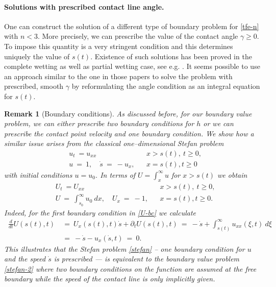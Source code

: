\documentclass[pagesize,pdftex]{amsart}
\newtheorem{remark}[theorem]{Remark}
\newcommand{\p}{\partial}
\newcommand{\gam}{\gamma}
\newcommand{\ddt}{\, \frac{d}{dt}}
\begin{document}
\paragraph{Solutions with prescribed contact line angle.} One can construct the
solution of a different type of boundary problem for \eqref{tfe-n} with
$n<3$. More precisely, we can prescribe the value of the contact angle
$\gam \geq 0$. To impose this quantity is a very stringent condition and this
determines uniquely the value of $s(t)$. Existence of such solutions has been
proved in the complete wetting as well as partial wetting case, see
e.g. \cite{BertozziPugh-1994,BerettaBertschDalpasso-1995,BertschDalpassoGarckeGruen-1998,DalpassoGarckeGruen-1998,Gruen-2004-1,GiacomelliKnuepferOtto-2008,GnannWisse-2022}. It
seems possible to use an approach similar to the one in those papers to solve
the problem with prescribed, smooth $\gam$ by reformulating the angle condition
as an integral equation for $s(t)$.
\begin{remark}[Boundary conditions] %
  As discussed before, for our boundary value problem, we can either prescribe
  two boundary conditions for $h$ or we can prescribe the contact point velocity
  and one boundary condition. We show how a similar issue arises from the
  classical one--dimensional Stefan problem
    \begin{align} \label{stefan}
      &u_t  \ = u_{xx}\ \ 
      &&x>s(t),  \ t \geq 0, \\
      &u  \ = \  1, \quad  \dot s \ = \ - u_x, 
      &&x = s(t),  t \geq 0
    \end{align}
    with initial conditions $u = u_0$. In terms of $U = \int_x^\infty u$ for
    $x > s(t)$ we obtain
    \begin{align} \label{stefan-2} 
      &U_t  \ = U_{xx}\ \ 
      &&x>s(t),  \ t \geq 0, \\
      &U  \ = \  \int_{s_0}^\infty u_0 \ dx, \quad  U_x \ = \ - 1,  
      &&x = s(t),  t \geq 0. \label{U-bc}
    \end{align}
    Indeed, for the first boundary condition in \eqref{U-bc} we calculate
    \begin{align}
      \ddt U(s(t), t) \ 
      &= \ U_x(s(t),t) \dot s  + \p_t U (s(t),t) \ 
        = \ - \dot s  + \int_{s(t)}^\infty u_{xx} (\xi,t) \ d\xi \\ 
      &= \ - \dot s  - u_{x} (\dot s,t) \ = \ 0. 
    \end{align}
    This illustrates that the Stefan problem \eqref{stefan} -- one boundary
    condition for $u$ and the speed $\dot s$ is prescribed --- is equivalent to the
boundary value problem \eqref{stefan-2} where two boundary conditions on the
function are assumed at the free boundary while the speed of the contact line is
only implicitly given.
\end{remark}
\end{document}
